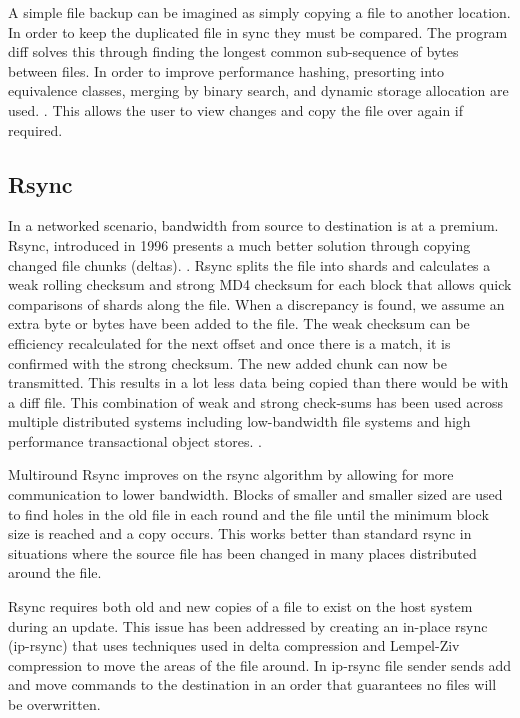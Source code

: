 \documentclass[11pt, a4paper, twocolumn, twoside]{report}
\begin{document}
A simple file backup can be imagined as simply copying a file to another location. In order to keep the duplicated file in sync they must be compared. The program diff solves this through finding the longest common sub-sequence of bytes between files. In order to improve performance hashing, presorting into equivalence classes, merging by binary search, and dynamic storage allocation are used. \citep{hunt1976algorithm}. This allows the user to view changes and copy the file over again if required.

\subsection{Rsync}
In a networked scenario, bandwidth from source to destination is at a premium. Rsync, introduced in 1996 presents a much better solution through copying changed file chunks (deltas). \citep{tridgell1996rsync}. Rsync splits the file into shards and calculates a weak rolling checksum and strong MD4 checksum for each block that allows quick comparisons of shards along the file. When a discrepancy is found, we assume an extra byte or bytes have been added to the file. The weak checksum can be efficiency recalculated for the next offset and once there is a match, it is confirmed with the strong checksum. The new added chunk can now be transmitted. This results in a lot less data being copied than there would be with a diff file. \citep{tridgell1996rsync} This combination of weak and strong check-sums has been used across multiple distributed systems including low-bandwidth file systems \citep{muthitacharoen2001low} and high performance transactional object stores. \citep{stephen2000platypus}.

Multiround Rsync improves on the rsync algorithm by allowing for more communication to lower bandwidth. Blocks of smaller and smaller sized are used to find holes in the old file in each round and the file until the minimum block size is reached and a copy occurs. \citep{multiroundrsync} This works better than standard rsync in situations where the source file has been changed in many places distributed around the file.

Rsync requires both old and new copies of a file to exist on the host system during an update. This issue has been addressed by creating an in-place rsync (ip-rsync) that uses techniques used in delta compression and Lempel-Ziv compression to move the areas of the file around. In ip-rsync file sender sends add and move commands to the destination in an order that guarantees no files will be overwritten. \citep{rasch2003place}
\end{document}
